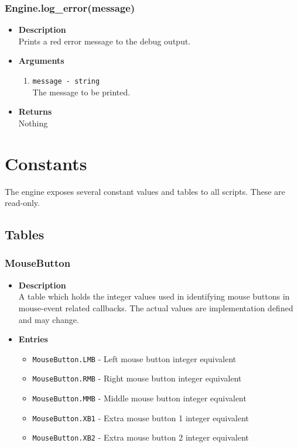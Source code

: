 \documentclass[12pt,a4paper]{article}
\begin{document}
\subsubsection{Engine.log\_error(message)}
\begin{itemize}
	\item[]{\bf Description}
		\\ Prints a red error message to the debug output.
	\item[]{\bf Arguments}
	\begin{enumerate}
		\item{\texttt{message - string}} 
			\\ The message to be printed.
	\end{enumerate}
	\item[]{\bf Returns}
		\\ Nothing
\end{itemize}

\pagebreak
\section{Constants}

The engine exposes several constant values and tables to all scripts. These are read-only.
\subsection{Tables}

\subsubsection{MouseButton}

\begin{itemize}
	\item[]{\bf Description}
		\\ A table which holds the integer values used in identifying mouse buttons in mouse-event related callbacks. The actual values are implementation defined and may change.
	\item[]{\bf Entries}
\begin{itemize}
	\item{\texttt{MouseButton.LMB}} - Left mouse button integer equivalent
	\item{\texttt{MouseButton.RMB}} - Right mouse button integer equivalent
	\item{\texttt{MouseButton.MMB}} - Middle mouse button integer equivalent
	\item{\texttt{MouseButton.XB1}} - Extra mouse button 1 integer equivalent
	\item{\texttt{MouseButton.XB2}} - Extra mouse button 2 integer equivalent
	
\end{itemize}
\end{itemize}
\end{document}

